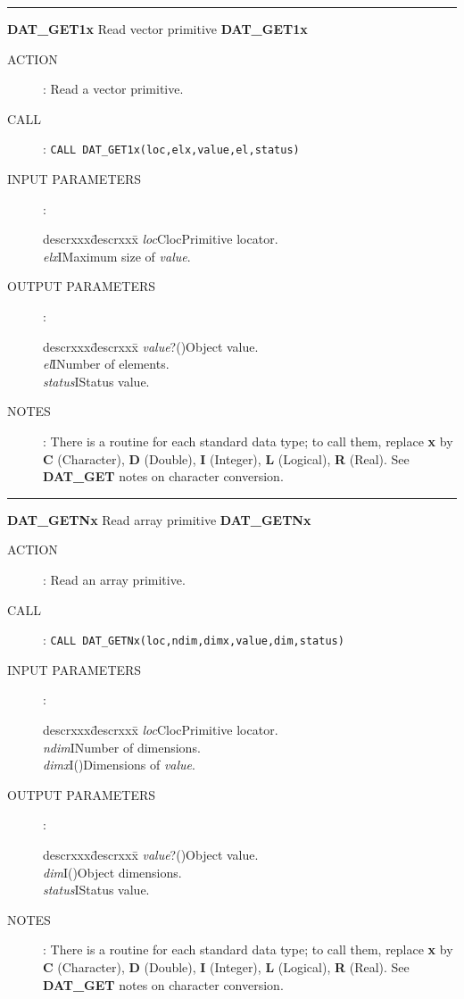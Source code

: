 \goodbreak
\rule{\textwidth}{0.3mm}
{\Large {\bf DAT\_GET1x} \hfill Read vector primitive \hfill {\bf DAT\_GET1x}}
\begin{description}
\item [ACTION]:
Read a vector primitive.
\item [CALL]:
{\tt CALL DAT\_GET1x(loc,elx,value,el,status)}
\item [INPUT PARAMETERS]:
\begin{tabbing}
descrxxx\=descrxxx\=\kill
{\em loc}\>Cloc\>Primitive locator.\\
{\em elx}\>I\>Maximum size of {\em value}.
\end{tabbing}
\item [OUTPUT PARAMETERS]:
\begin{tabbing}
descrxxx\=descrxxx\=\kill
{\em value}\>?()\>Object value.\\
{\em el}\>I\>Number of elements.\\
{\em status}\>I\>Status value.
\end{tabbing}
\item [NOTES]:
There is a routine for each standard data type; to call them, replace {\bf x}
by {\bf C} (Character), {\bf D} (Double), {\bf I} (Integer), {\bf L} (Logical),
{\bf R} (Real).
See {\bf DAT\_GET} notes on character conversion.
\end{description}
\goodbreak
\rule{\textwidth}{0.3mm}
{\Large {\bf DAT\_GETNx} \hfill Read array primitive \hfill {\bf DAT\_GETNx}}
\begin{description}
\item [ACTION]:
Read an array primitive.
\item [CALL]:
{\tt CALL DAT\_GETNx(loc,ndim,dimx,value,dim,status)}
\item [INPUT PARAMETERS]:
\begin{tabbing}
descrxxx\=descrxxx\=\kill
{\em loc}\>Cloc\>Primitive locator.\\
{\em ndim}\>I\>Number of dimensions.\\
{\em dimx}\>I()\>Dimensions of {\em value}.
\end{tabbing}
\item [OUTPUT PARAMETERS]:
\begin{tabbing}
descrxxx\=descrxxx\=\kill
{\em value}\>?()\>Object value.\\
{\em dim}\>I()\>Object dimensions.\\
{\em status}\>I\>Status value.
\end{tabbing}
\item [NOTES]:
There is a routine for each standard data type; to call them, replace {\bf x}
by {\bf C} (Character), {\bf D} (Double), {\bf I} (Integer), {\bf L} (Logical),
{\bf R} (Real).
See {\bf DAT\_GET} notes on character conversion.
\end{description}
